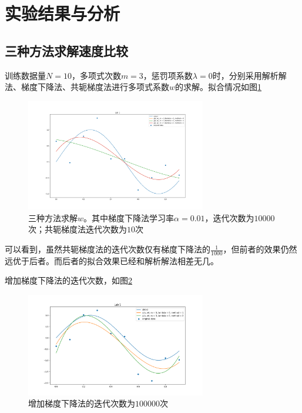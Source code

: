 \section{实验结果与分析}

\subsection{三种方法求解速度比较}

训练数据量$N = 10$，多项式次数$m = 3$，惩罚项系数$\lambda = 0$时，分别采用解析解法、梯度下降法、共轭梯度法进行多项式系数$w$的求解。拟合情况如图\ref{methods}

\begin{figure}
    \centering
    \includegraphics[width=0.7\textwidth]{figures/Figure_11.png}
    \caption{三种方法求解$w$。其中梯度下降法学习率$\alpha = 0.01$，迭代次数为$10000$次；共轭梯度法迭代次数为$10$次}
    \label{methods}
\end{figure}

可以看到，虽然共轭梯度法的迭代次数仅有梯度下降法的$\frac{1}{1000}$，但前者的效果仍然远优于后者。而后者的拟合效果已经和解析解法相差无几。

增加梯度下降法的迭代次数，如图\ref{methods1}

\begin{figure}
    \centering
    \includegraphics[width=0.7\textwidth]{figures/Figure_12.png}
    \caption{增加梯度下降法的迭代次数为$100000$次}
    \label{methods1}
\end{figure}

